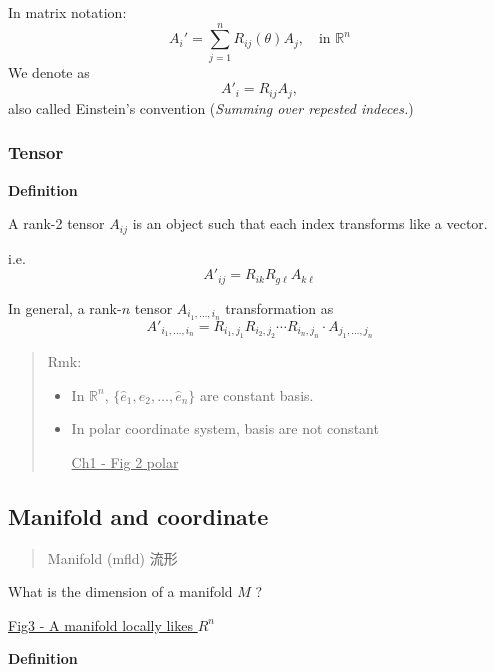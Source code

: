 In matrix notation:
\begin{equation}
A_i' = \sum_{j=1}^{n}R_{ij}(\theta) A_j,\quad \text{in $\mathbb{R}^n$}
\end{equation}
We denote as 
\begin{equation}
A'_i = R_{ij}A_j,
\end{equation}
also called Einstein's convention (\textit{Summing over repested indeces.})

\subsubsection{Tensor} %

\textbf{Definition}

A rank-2 tensor $A_{ij}$ is an object such that each index transforms like a vector.

i.e.
\begin{equation}
A'_{ij} = R_{ik}R_{g\ell}A_{k\ell}
\end{equation}


In general, a rank-$n$ tensor $A_{i_1,\ldots,i_n}$ transformation as 
\begin{equation}
A'_{i_1,\ldots,i_n} = R_{i_1,j_1}R_{i_2,j_2}\cdots R_{i_n,j_n}\cdot A_{j_1,\ldots,j_n}
\end{equation}


\begin{quote}
	Rmk:
\begin{itemize}
	\item In $\mathbb{R}^{n}$, $\{\hat{e}_1,\hat{e}_2,\ldots,\hat{e}_n\}$ are constant basis.

	\item In polar coordinate system, basis are not constant

\underline{Ch1 - Fig 2 polar}
\end{itemize}

\end{quote}
\subsection{Manifold and coordinate} %

\begin{quote}
	Manifold (mfld) 流形
\end{quote}

What is the dimension of a manifold $M$ ?

\underline{Fig3 - A manifold locally likes $R^n$}

\textbf{Definition}

